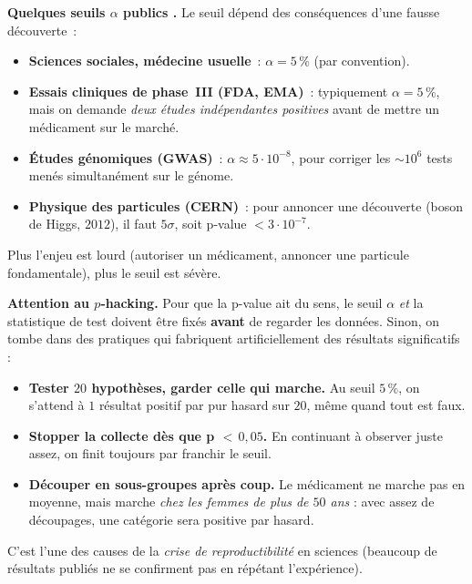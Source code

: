\begin{mdframed}[backgroundcolor=ThemeLight, linecolor=Theme,
  linewidth=1pt, innertopmargin=8pt, innerbottommargin=8pt]
\textbf{Quelques seuils $\alpha$ \og publics \fg{}.} Le seuil dépend des conséquences d'une fausse découverte~:
\begin{itemize}\setlength{\itemsep}{0.15em}
  \item \textbf{Sciences sociales, médecine usuelle}~: $\alpha = 5\,\%$ (par convention).
  \item \textbf{Essais cliniques de phase~III (FDA, EMA)}~: typiquement $\alpha = 5\,\%$, mais on demande \emph{deux études indépendantes positives} avant de mettre un médicament sur le marché.
  \item \textbf{Études génomiques (GWAS)}~: $\alpha \approx 5 \cdot 10^{-8}$, pour corriger les ${\sim}10^6$ tests menés simultanément sur le génome.
  \item \textbf{Physique des particules (CERN)}~: pour annoncer une \og découverte \fg{} (boson de Higgs, $2012$), il faut $5\sigma$, soit p-value $< 3 \cdot 10^{-7}$.
\end{itemize}
Plus l'enjeu est lourd (autoriser un médicament, annoncer une particule fondamentale), plus le seuil est sévère.
\end{mdframed}

\medskip

\begin{mdframed}[backgroundcolor=ThemeLight, linecolor=Accent,
  linewidth=1.5pt, innertopmargin=8pt, innerbottommargin=8pt]
\textbf{Attention au $p$-hacking.} Pour que la p-value ait du sens, le seuil $\alpha$ \emph{et} la statistique de test doivent être fixés \textbf{avant} de regarder les données. Sinon, on tombe dans des pratiques qui fabriquent artificiellement des résultats \og significatifs \fg{} :
\begin{itemize}\setlength{\itemsep}{0.15em}
  \item \textbf{Tester $20$ hypothèses, garder celle qui marche.} Au seuil $5\,\%$, on s'attend à $1$ résultat \og positif \fg{} par pur hasard sur $20$, même quand tout est faux.
  \item \textbf{Stopper la collecte dès que p $<\,0{,}05$.} En continuant à observer juste assez, on finit toujours par franchir le seuil.
  \item \textbf{Découper en sous-groupes après coup.} \og Le médicament ne marche pas en moyenne, mais marche \emph{chez les femmes de plus de $50$ ans} \fg{} : avec assez de découpages, une catégorie sera \og positive \fg{} par hasard.
\end{itemize}
C'est l'une des causes de la \emph{crise de reproductibilité} en sciences (beaucoup de résultats publiés ne se confirment pas en répétant l'expérience).
\end{mdframed}

